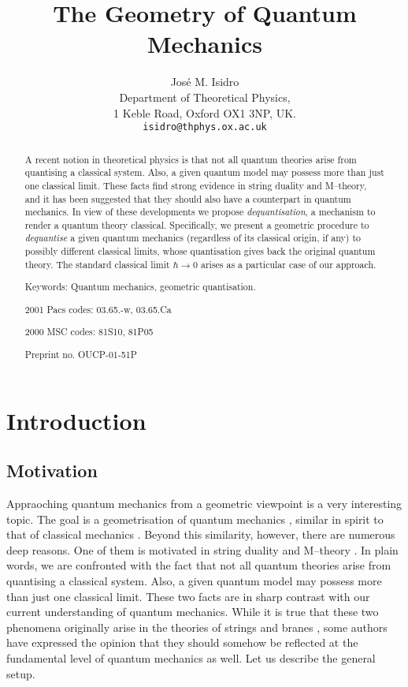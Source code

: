 \documentclass[a4paper,a4paper]{article}
\begin{document}
\title{The Geometry of Quantum Mechanics}
\author{Jos\'e M. Isidro\\
Department of Theoretical Physics,\\ 
1 Keble Road, 
Oxford OX1 3NP, UK.\\ 
{\tt isidro@thphys.ox.ac.uk}}
\maketitle

\begin{abstract}

A recent notion in theoretical physics is that not all quantum theories arise 
from quantising a classical system. Also, a given quantum model may possess more 
than just one classical limit. These facts find strong evidence in string 
duality and M--theory, and it has been suggested that they should also 
have a counterpart in quantum mechanics. In view of these developments 
we propose {\it dequantisation}, a mechanism to render a quantum theory 
classical. Specifically, we present a geometric procedure to {\it dequantise}
a given quantum mechanics (regardless of its classical origin, if any) 
to possibly different classical limits, whose quantisation gives back 
the original quantum theory. The standard classical limit $\hbar\to 0$ 
arises as a particular case of our approach.

Keywords: Quantum mechanics, geometric quantisation.

2001 Pacs codes: 03.65.-w, 03.65.Ca

2000 MSC codes: 81S10, 81P05

Preprint no. OUCP-01-51P

\end{abstract}

\tableofcontents

\section{Introduction}\label{intro}

\subsection{Motivation}\label{moti}

Appraoching quantum mechanics from a geometric viewpoint is a very interesting 
topic. The goal is a geometrisation of quantum mechanics \cite{ASHTEKAR},
similar in spirit to that of classical mechanics \cite{ARNOLD, RATIU}. 
Beyond this similarity, however, there are numerous deep reasons. 
One of them is motivated in string duality and M--theory \cite{SCHWARZ, VAFA}. 
In plain words, we are confronted with the fact that not all quantum theories 
arise from quantising a classical system. Also, a given quantum model may possess 
more than just one classical limit. These two facts are in sharp contrast with our 
current understanding of quantum mechanics. While it is true that these two phenomena 
originally arise in the theories of strings and branes \cite{KAKU}, 
some authors \cite{VAFA} have expressed the opinion that they should 
somehow be reflected at the fundamental level of quantum mechanics as well. 
Let us describe the general setup.
 
\end{document}
